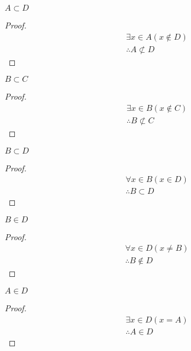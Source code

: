 \begin{question}
  \begin{subquestion}
    $A \subset D$
  \end{subquestion}
  \begin{proof}
    \begin{equation}
      \begin{split}
        & \exists x \in A (x \not \in D) \\
        & \therefore A \not \subset D
      \end{split}
    \end{equation}
  \end{proof}

  \begin{subquestion}
    $B \subset C$
  \end{subquestion}
  \begin{proof}
    \begin{align*}
      & \exists x \in B (x \not \in C) \\
      & \therefore B \not \subset C
    \end{align*}
  \end{proof}

  \begin{subquestion}
    $B \subset D$
  \end{subquestion}
  \begin{proof}
    \begin{align*}
      & \forall x \in B (x \in D) \\
      & \therefore B \subset D
    \end{align*}
  \end{proof}

  \begin{subquestion}
    $B \in D$
  \end{subquestion}
  \begin{proof}
    \begin{align*}
      & \forall x \in D (x \neq B) \\
      & \therefore B \not \in D
    \end{align*}
  \end{proof}

  \begin{subquestion}
    $A \in D$
  \end{subquestion}
  \begin{proof}
    \begin{align*}
      & \exists x \in D (x = A) \\
      & \therefore A \in D
    \end{align*}
  \end{proof}

\end{question}


